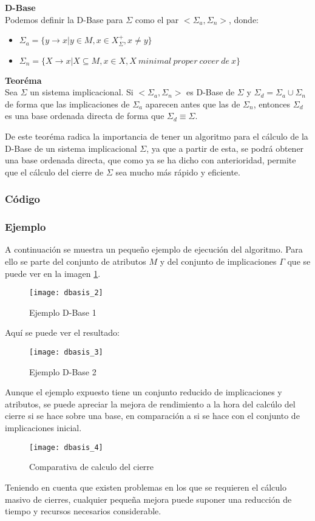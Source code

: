 \textbf{D-Base}\\
Podemos definir la D-Base para \(\Sigma\) como el par \(<\Sigma_a, \Sigma_n>\), donde:

\begin{itemize}
    \item \(\Sigma_a = \{y \to x | y \in M, x \in X^+_{\Sigma}, x \neq y \} \)
    \item \(\Sigma_n = \{X \to x | X \subseteq M, x \in X, X \ minimal \ proper \ cover \ de \ x\} \)

\end{itemize}

\textbf{Teor\'ema}\\
Sea \(\Sigma\) un sistema implicacional. Si \(<\Sigma_a, \Sigma_n>\) es D-Base de \(\Sigma\) y \(\Sigma_d = \Sigma_a\cup \Sigma_n\) de forma que las implicaciones de \(\Sigma_a\) aparecen antes que las de \(\Sigma_n\), entonces \(\Sigma_d\) es una base ordenada directa de forma que \(\Sigma_d \equiv \Sigma\).

De este teor\'ema radica la importancia de tener un algoritmo para el c\'alculo de la D-Base de un sistema implicacional \(\Sigma\), ya que a partir de esta, se podr\'a obtener una base ordenada directa, que como ya se ha dicho con anterioridad, permite que el c\'alculo del cierre de \(\Sigma\) sea mucho m\'as r\'apido y eficiente.\\


\newpage 
\subsubsection{C\'odigo} 

\newpage
\subsubsection{Ejemplo}
A continuaci\'on se muestra un peque\~no ejemplo de ejecuci\'on del algoritmo. Para ello se parte del conjunto de atributos \(M\) y del conjunto de implicaciones \(\Gamma\) que se puede ver en la imagen \ref{fig:dbasis_2}.
\begin{figure}[H]
    \centering
    \texttt{[image: dbasis\_2]}
    \caption{Ejemplo D-Base 1}
    \label{fig:dbasis_2}
\end{figure} 
Aqu\'i se puede ver el resultado:
\begin{figure}[H]
    \centering
    \texttt{[image: dbasis\_3]}
    \caption{Ejemplo D-Base 2}
    \label{fig:dbasis_3}
\end{figure} 
Aunque el ejemplo expuesto tiene un conjunto reducido de implicaciones y atributos, se puede apreciar la mejora de rendimiento a la hora del calc\'ulo del cierre si se hace sobre una base, en comparaci\'on a si se hace con el conjunto de implicaciones inicial.
\begin{figure}[H]
    \centering
    \texttt{[image: dbasis\_4]}
    \caption{Comparativa de calculo del cierre}
    \label{fig:dbasis_4}
\end{figure} 

Teniendo en cuenta que existen problemas en los que se requieren el c\'alculo masivo de cierres, cualquier peque\~na mejora puede suponer una reducci\'on de tiempo y recursos necesarios considerable.